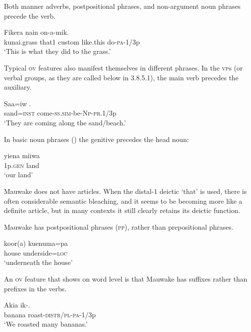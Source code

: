Both manner adverbs, postpositional phrases, and non-argument noun phrases precede the verb.

\ea%
\label{ex:x678}
\gll Fikera  nain     on-a-mik. \\
  kunai.grass  that1  custom  like.this  do-\textsc{pa}-1/3p    \\
\glt `This is what they did to the  grass.'
\z


Typical \textsc{ov} features also manifest themselves in different phrases. In the \textsc{vp}s (or verbal groups, as they are called below in 3.8.5.1), the main verb precedes the auxiliary.

\ea%
\label{ex:x679}
\gll Saa=iw . \\
 sand=\textsc{inst}  come-\textsc{ss}.\textsc{sim}-be-\textsc{Np}-\textsc{pr}.1/3p     \\
\glt`They are coming along the sand/beach.'
\z


In basic noun phrases () the genitive precedes the head noun:

\ea%
\label{ex:x680}
\gll yiena  miiwa \\
 1p.\textsc{gen}  land     \\
\glt`our land'
\z


Mauwake does not have articles. When the distal-1 deictic  `that' is used,  there is often considerable semantic bleaching, and it seems to be becoming more like a definite article, but in many contexts it still clearly retains its deictic function.  

Mauwake has postpositional phrases (\textsc{pp}), rather than prepositional phrases.

\ea%
\label{ex:x681}
\gll koor(a)  kuenuma=pa \\
 house  underside=\textsc{loc}     \\
\glt`underneath the house'
\z


An \textsc{ov} feature that shows on word level is that Mauwake has suffixes rather than prefixes in the verbs.

\ea%
\label{ex:x682}
\gll Akia  ik-. \\
 banana  roast-\textsc{distr}/\textsc{pl}-\textsc{pa}-1/3p     \\
\glt`We roasted many bananas.'
\z


